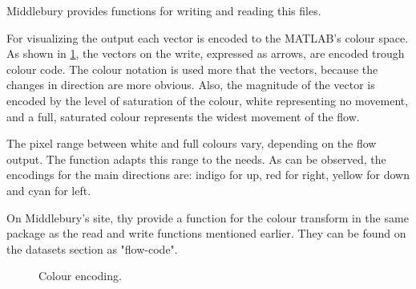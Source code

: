 \documentclass[12pt,a4paper,twoside]{report}
\begin{document}
{Middlebury\cite{middleburry} provides functions for writing and reading this files. 

For visualizing the output each vector is encoded to the MATLAB's colour space. As shown in \ref{colors}, the vectors on the write, expressed as arrows, are encoded trough colour code. The colour notation is  used more that the vectors, because the changes in direction are more obvious. Also, the magnitude of the vector is encoded by the level of saturation of the colour, white representing no movement, and a full, saturated colour represents the widest movement of the flow.

 The pixel range between white and full colours vary, depending on the flow output. The function adapts this range to the needs. As can be observed, the encodings for the main directions are: indigo for up, red for right, yellow for down and cyan for left.
 
 
  On Middlebury's site, thy provide a function for the colour transform in the same package as the read and write functions mentioned earlier. They can be found on the datasets section as "flow-code".  

\begin{figure}
	\label{colors}
	\centering
	\caption{Colour encoding.}
\end{figure}


}
\end{document}
